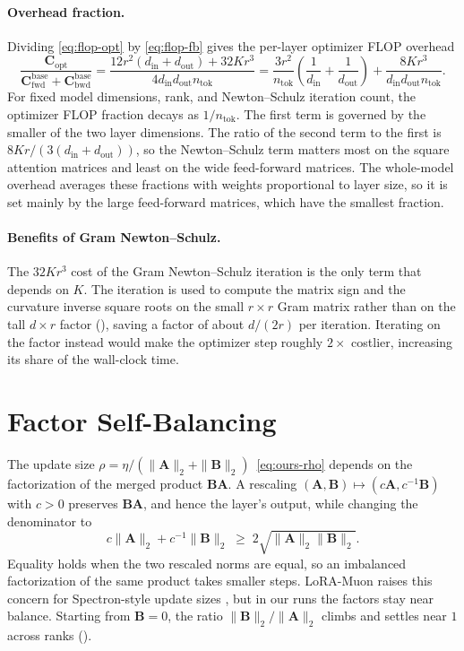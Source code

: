 \documentclass{article}
\newcommand{\mat}[1]{\bm{#1}}
\newcommand{\norm}[1]{\| #1\|}
\begin{document}
\paragraph{Overhead fraction.} Dividing \eqref{eq:flop-opt} by \eqref{eq:flop-fb} gives the
per-layer optimizer FLOP overhead 
\begin{equation}
  \frac{\mat{C}_{\mathrm{opt}}}{\mat{C}_{\mathrm{fwd}}^{\mathrm{base}}
  +\mat{C}_{\mathrm{bwd}}^{\mathrm{base}}}
  =
  \frac{
    12r^2(d_{\mathrm{in}}+d_{\mathrm{out}})
    +
    32Kr^3
  }{
    4d_{\mathrm{in}}d_{\mathrm{out}}n_{\mathrm{tok}}
  }
  =
  \frac{3r^2}{n_{\mathrm{tok}}}
  \left(
    \frac1{d_{\mathrm{in}}}
    +
    \frac1{d_{\mathrm{out}}}
  \right)
  +
  \frac{
    8Kr^3
  }{
    d_{\mathrm{in}}d_{\mathrm{out}}n_{\mathrm{tok}}
  } .
  \label{eq:flop-ratio}
\end{equation}
For fixed model dimensions, rank, and Newton--Schulz iteration count, the
optimizer FLOP fraction decays as $1/n_{\mathrm{tok}}$.
The first term is
governed by the smaller of the two layer dimensions. The ratio of the second term to the
first is $8Kr/(3(d_{\mathrm{in}}+d_{\mathrm{out}}))$, so the Newton--Schulz term matters
most on the square attention matrices and least on the wide feed-forward matrices.
The whole-model overhead averages these fractions with weights proportional to layer size,
so it is set mainly by the large feed-forward matrices, which have the smallest fraction.

\paragraph{Benefits of Gram Newton--Schulz.} The $32Kr^3$ cost of the Gram Newton--Schulz iteration is the only term that depends
on $K$. The iteration is used to compute the matrix sign and the curvature inverse square
roots on the small $r\times r$ Gram matrix rather than on the tall $d\times r$ factor
(), saving a factor of about $d/(2r)$ per iteration. Iterating on the factor
instead would make the optimizer step roughly $2\times$ costlier, increasing its share of
the wall-clock time.

\section{Factor Self-Balancing}
\label{app:gauge}
The update size $\rho=\eta/(\norm{\mat{A}}_2+\norm{\mat{B}}_2)$~\eqref{eq:ours-rho} depends on the factorization of the merged product $\mat{B}\mat{A}$. A rescaling $(\mat{A},\mat{B})\mapsto(c\mat{A},c^{-1}\mat{B})$ with $c>0$ preserves $\mat{B}\mat{A}$, and hence the layer's output, while changing the denominator to
\[
c\norm{\mat{A}}_2+c^{-1}\norm{\mat{B}}_2 \;\ge\; 2\sqrt{\norm{\mat{A}}_2\norm{\mat{B}}_2}.
\]
Equality holds when the two rescaled norms are equal, so an imbalanced factorization of the same product takes smaller steps. LoRA-Muon raises this concern for Spectron-style update sizes \cite{loramuon}, but in our runs the factors stay near balance. Starting from $\mat{B}=0$, the ratio $\norm{\mat{B}}_2/\norm{\mat{A}}_2$ climbs and settles near $1$ across ranks ().
\end{document}
